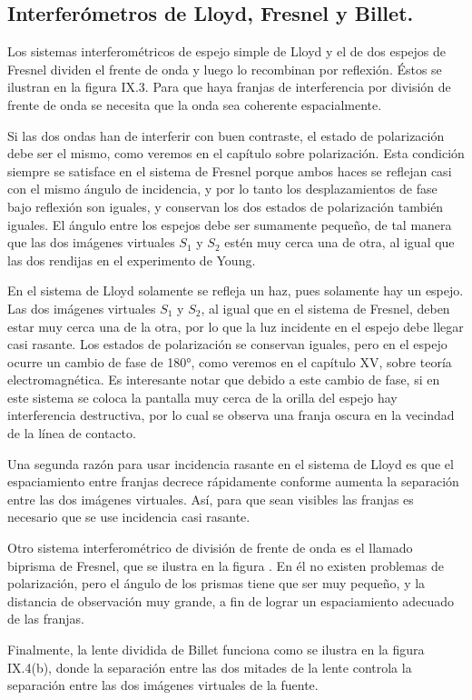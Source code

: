 \documentclass[14pt]{extarticle}
\begin{document}
\subsection{Interferómetros de Lloyd, Fresnel y Billet.}

Los sistemas interferométricos de espejo simple de Lloyd y el de dos espejos de Fresnel dividen el frente de onda y luego lo recombinan por reflexión. Éstos se ilustran en la figura IX.3. Para que haya franjas de interferencia por división de frente de onda se necesita que la onda sea coherente espacialmente.

Si las dos ondas han de interferir con buen contraste, el estado de polarización debe ser el mismo, como veremos en el capítulo sobre polarización. Esta condición siempre se satisface en el sistema de Fresnel porque ambos haces se reflejan casi con el mismo ángulo de incidencia, y por lo tanto los desplazamientos de fase bajo reflexión son iguales, y conservan los dos estados de polarización también iguales. El ángulo entre los espejos debe ser sumamente pequeño, de tal manera que las dos imágenes virtuales $S_{1}$ y $S_{2}$ estén muy cerca una de otra, al igual que las dos rendijas en el experimento de Young.

En el sistema de Lloyd solamente se refleja un haz, pues solamente hay un espejo. Las dos imágenes virtuales $S_{1}$ y $S_{2}$, al igual que en el sistema de Fresnel, deben estar muy cerca una de la otra, por lo que la luz incidente en el espejo debe llegar casi rasante. Los estados de polarización se conservan iguales, pero en el espejo ocurre un cambio de fase de \ang{180}, como veremos en el capítulo XV, sobre teoría electromagnética. Es interesante notar que debido a este cambio de fase, si en este sistema se coloca la pantalla muy cerca de la orilla del espejo hay interferencia destructiva, por lo cual se observa una franja oscura en la vecindad de la línea de contacto.

Una segunda razón para usar incidencia rasante en el sistema de Lloyd es que el espaciamiento entre franjas decrece rápidamente conforme aumenta la separación entre las dos imágenes virtuales. Así, para que sean visibles las franjas es necesario que se use incidencia casi rasante.

Otro sistema interferométrico de división de frente de onda es el llamado biprisma de Fresnel, que se ilustra en la figura . En él no existen problemas de polarización, pero el ángulo de los prismas tiene que ser muy pequeño, y la distancia de observación muy grande, a fin de lograr un espaciamiento adecuado de las franjas.

Finalmente, la lente dividida de Billet funciona como se ilustra en la figura IX.4(b), donde la separación entre las dos mitades de la lente controla la separación entre las dos imágenes virtuales de la fuente.
 
\end{document}
